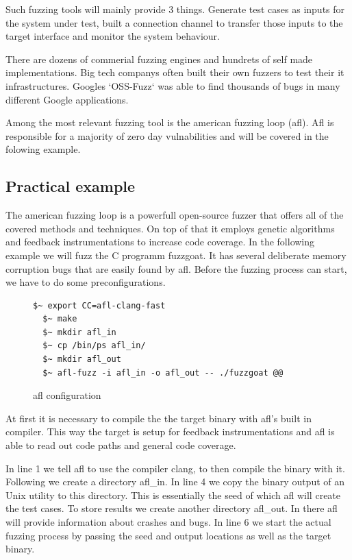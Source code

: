 \documentclass[journal=tosc,final]{iacrtrans}
\begin{document}
Such fuzzing tools will mainly provide 3 things. Generate test cases as inputs for the system under test, built a connection channel to transfer those inputs to the target interface and monitor the system behaviour.

There are dozens of commerial fuzzing engines and hundrets of self made implementations. Big tech companys often built their own fuzzers to test their it infrastructures. Googles `OSS-Fuzz` was able to find thousands of bugs in many different Google applications. 

Among the most relevant fuzzing tool is the american fuzzing loop (afl).
Afl is responsible for a majority of zero day vulnabilities and will be covered in the folowing example.
\subsection{Practical example}
The american fuzzing loop is a powerfull open-source fuzzer that offers all of the covered methods and techniques. On top of that it employs genetic algorithms and feedback instrumentations to increase code coverage. In the following example we will fuzz the C programm fuzzgoat. It has several deliberate memory corruption bugs that are easily found by afl. Before the fuzzing process can start, we have to do some preconfigurations. 
\begin{figure}[h]
 \caption{afl configuration}
 \begin{lstlisting}[style=code]
  $~ export CC=afl-clang-fast
  $~ make
  $~ mkdir afl_in
  $~ cp /bin/ps afl_in/   
  $~ mkdir afl_out
  $~ afl-fuzz -i afl_in -o afl_out -- ./fuzzgoat @@
\end{lstlisting}
\end{figure}

At first it is necessary to compile the the target binary with afl's built in compiler. This way the target is setup for feedback instrumentations and afl is able to read out code paths and general code coverage.

In line 1 we tell afl to use the compiler clang, to then compile the binary with it.
Following we create a directory afl\_in. In line 4 we copy the binary output of an Unix utility to this directory. This is essentially the seed of which afl will create the test cases. To store results we create another directory afl\_out. In there afl will provide information about crashes and bugs. 
In line 6 we start the actual fuzzing process by passing the seed and output locations as well as the target binary. 
\end{document}
